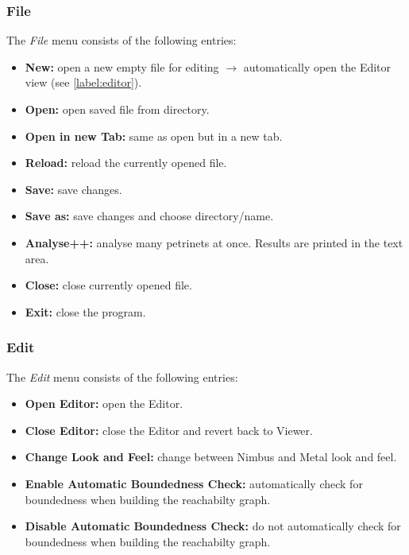 \documentclass[10pt, a4paper]{article}
\begin{document}
\subsubsection{File}
\label{label:file}
The \textit{File} menu consists of the following entries:

\begin{itemize}

\item \textbf{New:} open a new empty file for editing $\rightarrow$ automatically open the Editor view (see \ref{label:editor}). 
\item \textbf{Open:} open saved file from directory.
\item \textbf{Open in new Tab:} same as open but in a new tab.
\item \textbf{Reload:} reload the currently opened file.
\item \textbf{Save:} save changes.
\item \textbf{Save as:} save changes and choose directory/name.
\item \textbf{Analyse++:} analyse many petrinets at once. Results are printed in the text area.
\item \textbf{Close:} close currently opened file.
\item \textbf{Exit:} close the program.

\end{itemize}


\subsubsection{Edit}


The \textit{Edit} menu consists of the following entries:


\begin{itemize}
\item \textbf{Open Editor:} open the Editor.
\item \textbf{Close Editor:} close the Editor and revert back to Viewer.
\item \textbf{Change Look and Feel:} change between Nimbus and Metal look and feel.
\item \textbf{Enable Automatic Boundedness Check:} automatically check for boundedness when building the reachabilty graph.
\item \textbf{Disable Automatic Boundedness Check:} do not automatically check for boundedness when building the reachabilty graph.
\end{itemize}
\end{document}
